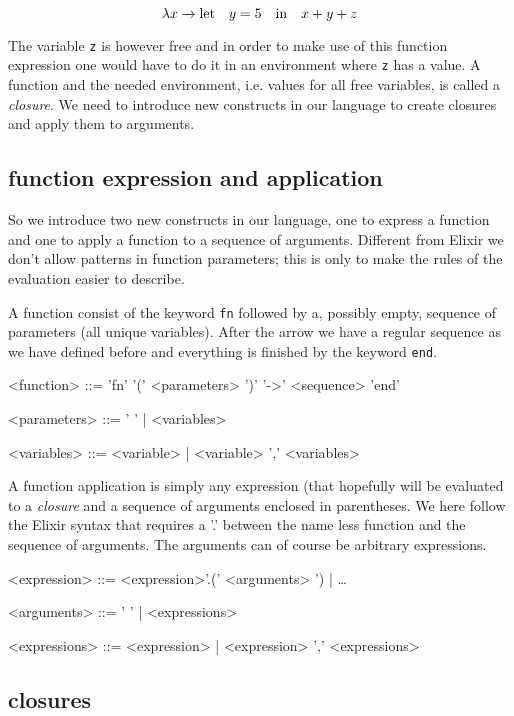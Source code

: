 \documentclass[a4paper,11pt]{article}
\begin{document}
$$ \lambda x \rightarrow {\rm let} \quad y = 5 \quad {\rm in} \quad x + y + z$$

The variable {\tt z} is however free and in order to make use of this
function expression one would have to do it in an environment where
{\tt z} has a value. A function and the needed environment,
i.e. values for all free variables, is called a {\em closure}. We need
to introduce new constructs in our language to create closures and
apply them to arguments.


\subsection{function expression and application}

So we introduce two new constructs in our language, one to express a
function and one to apply a function to a sequence of
arguments. Different from Elixir we don't allow patterns in function
parameters; this is only to make the rules of the evaluation easier to
describe.

A function consist of the keyword {\tt fn} followed by a, possibly
empty, sequence of parameters (all unique variables). After the arrow
we have a regular sequence as we have defined before and everything is
finished by the keyword {\tt end}.

\begin{grammar}
<function> ::= 'fn' '(' <parameters> ')' '-\textgreater' <sequence> 'end'

<parameters> ::= ' ' | <variables> 

<variables> ::= <variable> |  <variable> ',' <variables>
\end{grammar}

A function application is simply any expression (that hopefully will
be evaluated to a {\em closure} and a sequence of arguments enclosed
in parentheses. We here follow the Elixir syntax that requires a
'.' between the name less function and the sequence of arguments.
The arguments can of course be arbitrary expressions.

\begin{grammar}
<expression> ::=  <expression>'.(' <arguments> ') | \ldots 

<arguments> ::= '  ' | <expressions> 

<expressions> ::= <expression> | <expression> ',' <expressions>
\end{grammar}

\subsection{closures}
\end{document}
